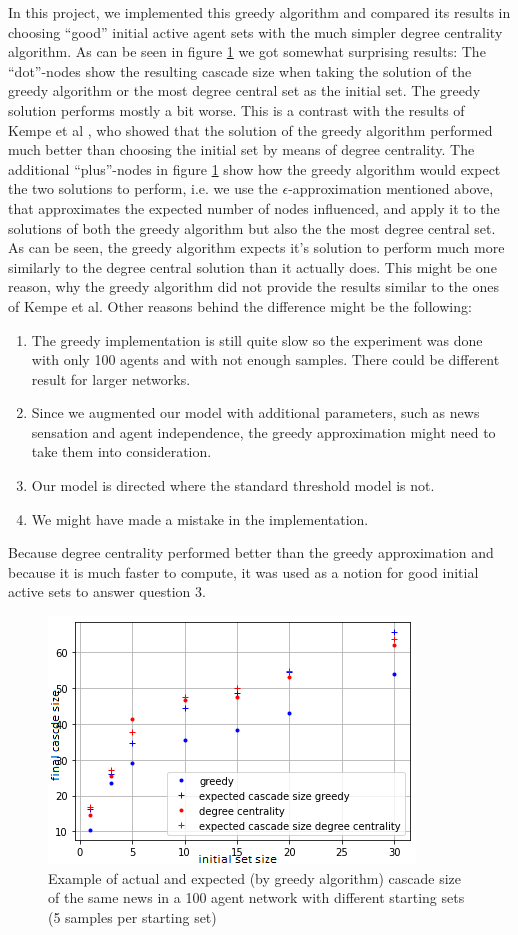 \documentclass[10pt]{article}
\begin{document}
In this project, we implemented this greedy algorithm and compared its results in choosing ``good'' initial active agent sets with the much simpler degree centrality algorithm. As can be seen in figure \ref{fig:greedy} we got somewhat surprising results: The ``dot''-nodes show the resulting cascade size when taking the solution of the greedy algorithm or the most degree central set as the initial set. The greedy solution performs mostly a bit worse. This is a contrast with the results of Kempe et al \cite{kempe2003maximizing}, who showed that the solution of the greedy algorithm performed much better than choosing the initial set by means of degree centrality. The additional ``plus''-nodes in figure \ref{fig:greedy} show how the greedy algorithm would expect the two solutions to perform, i.e. we use the $\epsilon$-approximation mentioned above, that approximates the expected number of nodes influenced, and apply it to the solutions of both the greedy algorithm but also the the most degree central set. As can be seen, the greedy algorithm expects it's solution to perform much more similarly to the degree central solution than it actually does. This might be one reason, why the greedy algorithm did not provide the results similar to the ones of Kempe et al. Other reasons behind the difference might be the following:
\begin{enumerate}
    \item[1.] The greedy implementation is still quite slow so the experiment was done with only 100 agents and with not enough samples. There could be different result for larger networks.
    \item[2.] Since we augmented our model with additional parameters, such as news sensation and agent independence, the greedy approximation might need to take them into consideration.
    \item[3.] Our model is directed where the standard threshold model is not.
    \item[4.] We might have made a mistake in the implementation.
\end{enumerate}
Because degree centrality performed better than the greedy approximation and because it is much faster to compute, it was used as a notion for good initial active sets to answer question 3. \\

\begin{figure}
\centering
\includegraphics[width=.6\linewidth]{images/greedy.png}
\caption{Example of actual and expected (by greedy algorithm) cascade size of the same news in a 100 agent network with different starting sets (5 samples per starting set)}
\label{fig:greedy}
\end{figure}
\end{document}
